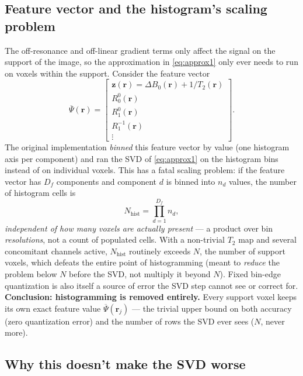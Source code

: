 \documentclass{article}
\begin{document}
\subsection{Feature vector and the histogram's scaling problem}
\label{sec:histogram}

The off-resonance and off-linear gradient terms only affect the signal on the support of the
image, so the approximation in \eqref{eq:approx1} only ever needs to run on voxels within the
support. Consider the feature vector
\begin{equation}
    \overline{\Psi}(\mathbf{r}) = \begin{bmatrix}
        \mathbf{z}(\mathbf{r}) = \Delta B_0(\mathbf{r}) + 1/ T_2(\mathbf{r}) \\
        R^0_0(\mathbf{r}) \\
        R^0_1(\mathbf{r}) \\
        R^{-1}_1(\mathbf{r}) \\
        \vdots
    \end{bmatrix}.
\end{equation}
The original implementation \emph{binned} this feature vector by value (one histogram axis per
component) and ran the SVD of \eqref{eq:approx1} on the histogram bins instead of on individual
voxels. This has a fatal scaling problem: if the feature vector has $D_f$ components and
component $d$ is binned into $n_d$ values, the number of histogram cells is
\begin{equation}
    N_{\mathrm{hist}} = \prod_{d=1}^{D_f} n_d,
    \label{eq:hist_blowup}
\end{equation}
\emph{independent of how many voxels are actually present} — a product over bin
\emph{resolutions}, not a count of populated cells. With a non-trivial $T_2$ map and several
concomitant channels active, $N_{\mathrm{hist}}$ routinely exceeds $N$, the number of support
voxels, which defeats the entire point of histogramming (meant to \emph{reduce} the problem below
$N$ before the SVD, not multiply it beyond $N$). Fixed bin-edge quantization is also itself a
source of error the SVD step cannot see or correct for. \textbf{Conclusion: histogramming is
removed entirely.} Every support voxel keeps its own exact feature value
$\overline\Psi(\mathbf{r}_j)$ — the trivial upper bound on both accuracy (zero quantization
error) and the number of rows the SVD ever sees ($N$, never more).

\subsection{Why this doesn't make the SVD worse}
\label{sec:featurebasis}
\end{document}
